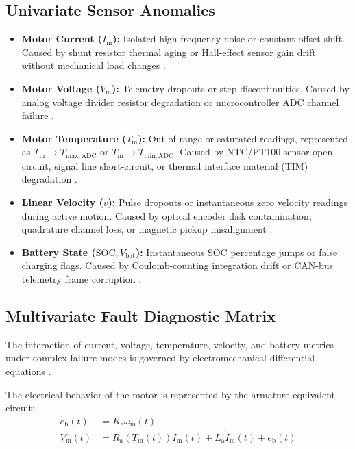 \subsection{Univariate Sensor Anomalies}
\begin{itemize}
    \item \textbf{Motor Current ($I_{\mathrm{m}}$):} Isolated high-frequency noise or constant offset shift. Caused by shunt resistor thermal aging or Hall-effect sensor gain drift without mechanical load changes \cite{Pillai2024Taxonomy}.
    \item \textbf{Motor Voltage ($V_{\mathrm{m}}$):} Telemetry dropouts or step-discontinuities. Caused by analog voltage divider resistor degradation or microcontroller ADC channel failure \cite{Kim2022HealthMonitoring}.
    \item \textbf{Motor Temperature ($T_{\mathrm{m}}$):} Out-of-range or saturated readings, represented as $T_{\mathrm{m}} \to T_{\mathrm{max,ADC}}$ or $T_{\mathrm{m}} \to T_{\mathrm{min,ADC}}$. Caused by NTC/PT100 sensor open-circuit, signal line short-circuit, or thermal interface material (TIM) degradation \cite{Li2023Prognostics, Pillai2024Taxonomy}.
    \item \textbf{Linear Velocity ($v$):} Pulse dropouts or instantaneous zero velocity readings during active motion. Caused by optical encoder disk contamination, quadrature channel loss, or magnetic pickup misalignment \cite{Kim2022HealthMonitoring}.
    \item \textbf{Battery State ($\mathrm{SOC}, V_{\mathrm{bat}}$):} Instantaneous SOC percentage jumps or false charging flags. Caused by Coulomb-counting integration drift or CAN-bus telemetry frame corruption \cite{Kim2022HealthMonitoring}.
\end{itemize}

\subsection{Multivariate Fault Diagnostic Matrix}

The interaction of current, voltage, temperature, velocity, and battery metrics under complex failure modes is governed by electromechanical differential equations \cite{Todeschini2015Actuator}.

The electrical behavior of the motor is represented by the armature-equivalent circuit:
\begin{align}
    e_{\mathrm{b}}(t) &= K_{\mathrm{e}} \omega_{\mathrm{m}}(t) \label{eq:motor_back_emf} \\
    V_{\mathrm{m}}(t) &= R_{\mathrm{a}}(T_{\mathrm{m}}(t)) I_{\mathrm{m}}(t) + L_{\mathrm{a}} \dot{I}_{\mathrm{m}}(t) + e_{\mathrm{b}}(t) \label{eq:motor_voltage}
\end{align}


